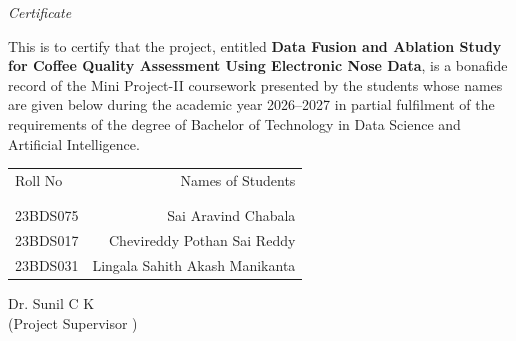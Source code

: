 \newpage
\thispagestyle{empty}
\clearpage             %
\thispagestyle{empty}  %
\phantom{a}            %
\newpage
\thispagestyle{empty}

\begin{center}

	\emph{\huge{Certificate}}\\[2.5cm]
\end{center}
\normalsize This is to certify that the project, entitled \textbf{Data Fusion and Ablation Study for Coffee Quality Assessment Using Electronic Nose Data}, is a bonafide record of the Mini Project-II coursework presented by the students whose names are given below during the academic year 2026--2027 in partial fulfilment of the requirements of the degree of Bachelor of Technology in Data Science and Artificial Intelligence.\\[1.0cm]

\begin{table}[h]
	\centering
	\begin{tabular}{lr}
		Roll No & Names of Students \\ \\ \hline
		\\
		23BDS075 & Sai Aravind Chabala \\
		23BDS017 & Chevireddy Pothan Sai Reddy \\
		23BDS031 & Lingala Sahith Akash Manikanta \\
	\end{tabular}
\end{table}

\vfill


\begin{flushright}
	Dr. Sunil C K\\
	(Project Supervisor )\\[1.5cm]
\end{flushright}

\newpage
\hypersetup{pageanchor=true}
\setcounter{page}{1}
\hypersetup{linkcolor=black}    %
\tableofcontents
\newpage
{}
\listoffigures
\newpage
{}
\listoftables
\hypersetup{linkcolor=linkblue}



